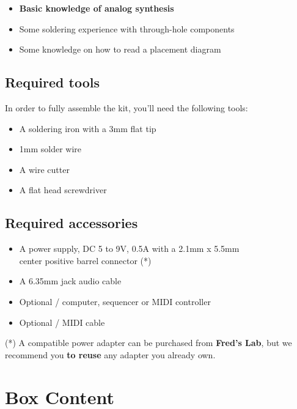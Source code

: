 \documentclass{scrartcl}
\begin{document}
\begin{itemize}
    \item \textbf{Basic knowledge of analog synthesis}
    \item Some soldering experience with through-hole components
    \item Some knowledge on how to read a placement diagram
\end{itemize}

\subsection{Required tools}

In order to fully assemble the kit, you'll need the following tools:

\begin{itemize}
    \item A soldering iron with a 3mm flat tip
    \item 1mm solder wire
    \item A wire cutter
    \item A flat head screwdriver
\end{itemize}

\subsection{Required accessories}

\begin{itemize}
    \item A power supply, DC 5 to 9V, 0.5A with a 2.1mm x 5.5mm \\
    center positive barrel connector  (*)
    \item A 6.35mm jack audio cable
    \item Optional / computer, sequencer or MIDI controller
    \item Optional / MIDI cable
\end{itemize}

\vspace{0.25cm}
(*) A compatible power adapter can be purchased from \textbf{Fred's Lab},
but we recommend you \textbf{to reuse} any adapter you already own.

\pagebreak
\section{Box Content}
\end{document}
